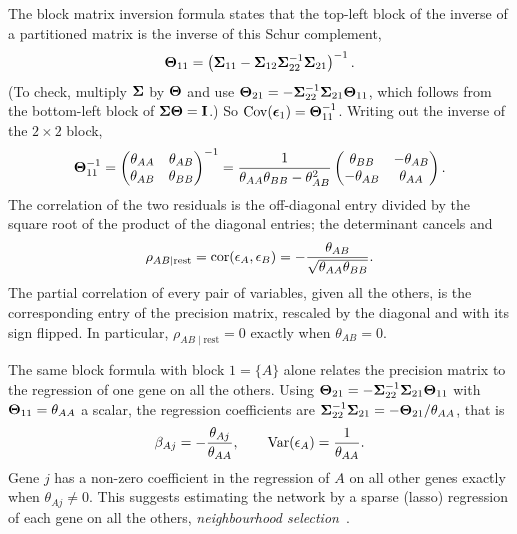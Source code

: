 The block matrix inversion formula states that the top-left block of the inverse of a partitioned matrix is the inverse of this Schur complement,
\begin{equation}
  \boldsymbol{\Theta}_{11} = \left(\boldsymbol{\Sigma}_{11}-\boldsymbol{\Sigma}_{12}\boldsymbol{\Sigma}_{22}^{-1}\boldsymbol{\Sigma}_{21}\right)^{-1}.
\end{equation}
(To check, multiply $\boldsymbol{\Sigma}$ by $\boldsymbol{\Theta}$ and use $\boldsymbol{\Theta}_{21}=-\boldsymbol{\Sigma}_{22}^{-1}\boldsymbol{\Sigma}_{21}\boldsymbol{\Theta}_{11}$, which follows from the bottom-left block of $\boldsymbol{\Sigma}\boldsymbol{\Theta}=\mathbf{I}$.) So $\operatorname{Cov}(\boldsymbol{\epsilon}_1)=\boldsymbol{\Theta}_{11}^{-1}$. Writing out the inverse of the $2\times2$ block,
\begin{equation}
  \boldsymbol{\Theta}_{11}^{-1} = \begin{pmatrix}\theta_{AA} & \theta_{AB}\\ \theta_{AB} & \theta_{BB}\end{pmatrix}^{-1}
  = \frac{1}{\theta_{AA}\theta_{BB}-\theta_{AB}^2}\begin{pmatrix}\theta_{BB} & -\theta_{AB}\\ -\theta_{AB} & \theta_{AA}\end{pmatrix}.
\end{equation}
The correlation of the two residuals is the off-diagonal entry divided by the square root of the product of the diagonal entries; the determinant cancels and
\begin{equation}
  \rho_{AB\mid\text{rest}} = \operatorname{cor}(\epsilon_A,\epsilon_B) = -\frac{\theta_{AB}}{\sqrt{\theta_{AA}\theta_{BB}}}.
  \label{eq:partial_corr}
\end{equation}
The partial correlation of every pair of variables, given all the others, is the corresponding entry of the precision matrix, rescaled by the diagonal and with its sign flipped. In particular, $\rho_{AB\mid\text{rest}}=0$ exactly when $\theta_{AB}=0$.

The same block formula with block $1=\{A\}$ alone relates the precision matrix to the regression of one gene on all the others. Using $\boldsymbol{\Theta}_{21}=-\boldsymbol{\Sigma}_{22}^{-1}\boldsymbol{\Sigma}_{21}\boldsymbol{\Theta}_{11}$ with $\boldsymbol{\Theta}_{11}=\theta_{AA}$ a scalar, the regression coefficients are $\boldsymbol{\Sigma}_{22}^{-1}\boldsymbol{\Sigma}_{21}=-\boldsymbol{\Theta}_{21}/\theta_{AA}$, that is
\begin{equation}
  \beta_{Aj} = -\frac{\theta_{Aj}}{\theta_{AA}}, \qquad \operatorname{Var}(\epsilon_A) = \frac{1}{\theta_{AA}}.
\end{equation}
Gene $j$ has a non-zero coefficient in the regression of $A$ on all other genes exactly when $\theta_{Aj}\neq 0$. This suggests estimating the network by a sparse (lasso) regression of each gene on all the others, \emph{neighbourhood selection}~\citep{meinshausen2006}.

